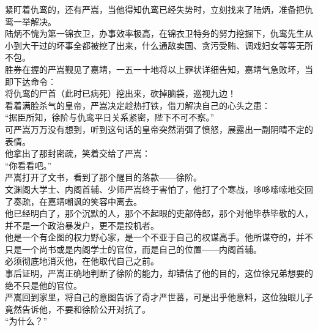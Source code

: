 \begin{multicols}{\theparacolNo}
紧盯着仇鸾的，还有严嵩，当他得知仇鸾已经失势时，立刻找来了陆炳，准备把仇鸾一举解决。\\

陆炳不愧为第一锦衣卫，办事效率极高，在锦衣卫特务的努力挖掘下，仇鸾先生从小到大干过的坏事全都被挖了出来，什么通敌卖国、贪污受贿、调戏妇女等等无所不包。\\

胜券在握的严嵩觐见了嘉靖，一五一十地将以上罪状详细告知，嘉靖气急败坏，当即下达命令：\\

将仇鸾的尸首（此时已病死）挖出来，砍掉脑袋，巡视九边！\\

看着满脸杀气的皇帝，严嵩决定趁热打铁，借刀解决自己的心头之患：\\

“据臣所知，徐阶与仇鸾平日关系紧密，陛下不可不察。”\\

可严嵩万万没有想到，听到这句话的皇帝突然消弭了愤怒，展露出一副阴晴不定的表情。\\

他拿出了那封密疏，笑着交给了严嵩：\\

“你看看吧。”\\

严嵩打开了文书，看到了那个醒目的落款——徐阶。\\

文渊阁大学士、内阁首辅、少师严嵩终于害怕了，他打了个寒战，哆哆嗦嗦地交回了奏疏，在嘉靖嘲讽的笑容中离去。\\

他已经明白了，那个沉默的人，那个不起眼的吏部侍郎，那个对他毕恭毕敬的人，并不是一个政治暴发户，更不是投机者。\\

他是一个有企图的权力野心家，是一个不亚于自己的权谋高手。他所谋夺的，并不只是一个尚书或是内阁学士的官位，而是自己的位置——内阁首辅。\\

必须彻底地消灭他，在他取代自己之前。\\

事后证明，严嵩正确地判断了徐阶的能力，却错估了他的目的，这位徐兄弟想要的绝不只是他的官位。\\

严嵩回到家里，将自己的意图告诉了奇才严世蕃，可是出乎他意料，这位独眼儿子竟然告诉他，不要和徐阶公开对抗了。\\

“为什么？”\\


\end{multicols}
